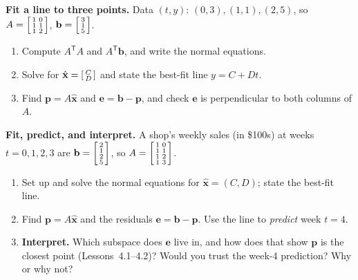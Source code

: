 \documentclass[10pt]{article}
\newcommand{\xx}{\mathbf{x}}
\newcommand{\bb}{\mathbf{b}}
\newcommand{\pp}{\mathbf{p}}
\newcommand{\ee}{\mathbf{e}}
\newcommand{\T}{\mathsf{T}}
\begin{document}
\begin{tcolorbox}[colback=white, colframe=black!40, title=\textbf{Tier A --- Approaching Proficiency},
    fonttitle=\bfseries, arc=1.5mm, left=3mm, right=3mm, top=2mm, bottom=2mm, breakable]
\textbf{Fit a line to three points.} Data $(t,y)$: $(0,3),(1,1),(2,5)$, so
$A=\begin{bsmallmatrix} 1&0\\ 1&1\\ 1&2 \end{bsmallmatrix}$, $\bb=\begin{bsmallmatrix} 3\\1\\5 \end{bsmallmatrix}$.
\begin{enumerate}[leftmargin=1.7em, itemsep=9pt]
  \item Compute $A^{\T}A$ and $A^{\T}\bb$, and write the normal equations. 
  \item Solve for $\hat{\xx}=\begin{bsmallmatrix} C\\ D \end{bsmallmatrix}$ and state the best-fit line
        $y=C+Dt$. 
  \item Find $\pp=A\hat{\xx}$ and $\ee=\bb-\pp$, and check $\ee$ is perpendicular to both columns of $A$.
\end{enumerate}
\end{tcolorbox}

\begin{tcolorbox}[colback=white, colframe=black!40, title=\textbf{Tier E --- Extension},
    fonttitle=\bfseries, arc=1.5mm, left=3mm, right=3mm, top=2mm, bottom=2mm, breakable]
\textbf{Fit, predict, and interpret.} A shop's weekly sales (in \$100s) at weeks $t=0,1,2,3$ are
$\bb=\begin{bsmallmatrix} 2\\1\\2\\5 \end{bsmallmatrix}$, so $A=\begin{bsmallmatrix} 1&0\\ 1&1\\ 1&2\\ 1&3 \end{bsmallmatrix}$.
\begin{enumerate}[leftmargin=1.7em, itemsep=9pt]
  \item Set up and solve the normal equations for $\hat{\xx}=(C,D)$; state the best-fit line. 
  \item Find $\pp=A\hat{\xx}$ and the residuals $\ee=\bb-\pp$. Use the line to \emph{predict} week $t=4$.
  \item \textbf{Interpret.} Which subspace does $\ee$ live in, and how does that show $\pp$ is the closest
        point (Lessons~4.1--4.2)? Would you trust the week-4 prediction? Why or why not? 
\end{enumerate}
\end{tcolorbox}
\end{document}
